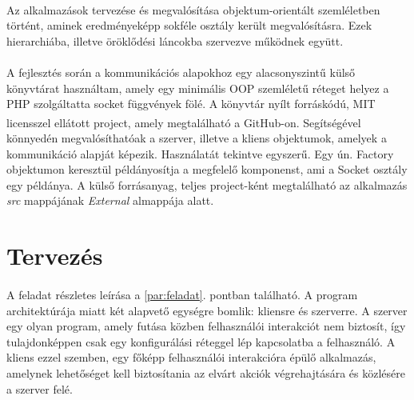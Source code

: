 \documentclass[12pt]{report}
\begin{document}
\paragraph{}
Az alkalmazások tervezése és megvalósítása objektum-orientált szemléletben történt, aminek eredményeképp sokféle osztály került megvalósításra. Ezek hierarchiába, illetve öröklődési láncokba szervezve működnek együtt.
\paragraph{}
A fejlesztés során a kommunikációs alapokhoz egy alacsonyszintű külső könyvtárat használtam, amely egy minimális OOP szemléletű réteget helyez a PHP szolgáltatta socket függvények fölé. A könyvtár nyílt forráskódú, MIT licensszel ellátott project, amely megtalálható a GitHub-on.\textsuperscript{\cite{cluesocket}} Segítségével könnyedén megvalósíthatóak a szerver, illetve a kliens objektumok, amelyek a kommunikáció alapját képezik. Használatát tekintve egyszerű. Egy ún. Factory objektumon keresztül példányosítja a megfelelő komponenst, ami a Socket osztály egy példánya.
A külső forrásanyag, teljes project-ként megtalálható az alkalmazás \textit{src} mappájának \textit{External} almappája alatt.
\pagebreak
\section{Tervezés}
\paragraph{}
A  feladat részletes leírása a \ref{par:feladat}. pontban található. A program architektúrája miatt két alapvető egységre bomlik: kliensre és szerverre. A szerver egy olyan program, amely futása közben felhasználói interakciót nem biztosít, így tulajdonképpen csak egy konfigurálási réteggel lép kapcsolatba a felhasználó. A kliens ezzel szemben, egy főképp felhasználói interakcióra épülő alkalmazás, amelynek lehetőséget kell biztosítania az elvárt akciók végrehajtására és közlésére a szerver felé.
\end{document}
